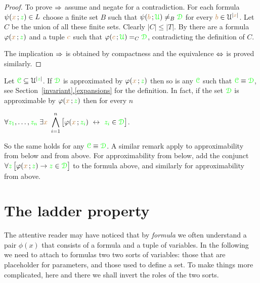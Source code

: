 \documentclass[creche.tex]{subfiles}
\begin{document}
\begin{proof}
To prove $\Rightarrow$ assume  and negate  for a contradiction. For each formula $\psi({\color{brown} x}\,;{\color{green} z})\in L$ choose a finite set $B$ such that $\psi({\color{brown} b}\,;{\color{green}\EuScript U})\neq_B{\color{green}\EuScript D}$ for every ${\color{brown} b}\in\EuScript U^{|{\color{brown} x}|}$. Let $C$ be the union of all these finite sets. Clearly $|C|\le|T|$. By  there are a formula $\varphi({\color{brown} x}\,;{\color{green} z})$ and a tuple ${\color{brown} c}$ such that $\varphi({\color{brown} c}\,;{\color{green}\EuScript U})=_C{\color{green}\EuScript D}$, contradicting the definition of $C$.

The implication $\Rightarrow$ is obtained by compactness and the equivalence $\Leftrightarrow$ is proved similarly. 
\end{proof}



\begin{remark}\label{prop_approx_el_eq}
Let ${\color{green}\EuScript C}\subseteq\EuScript U^{|{\color{green} z}|}$. If ${\color{green}\EuScript D}$ is approximated by $\varphi({\color{brown} x}\,;{\color{green} z})$ then so is any ${\color{green}\EuScript C}$ such that ${\color{green}\EuScript C}\equiv{\color{green}\EuScript D}$, see Section~\hyperref[expansions]{\ref*{invariant}.\ref*{expansions}} for the definition. In fact, if the set ${\color{green}\EuScript D}$ is approximable by $\varphi({\color{brown} x}\,;{\color{green} z})$ then for every $n$

\hfil$\displaystyle\A {\gr z_1},\dots,{\gr z_n}\;\E {\mr x}\ \bigwedge^n_{i=1}\big[\phi({\mr x}\,;{\gr z_i})\ \iff\ {\gr z_i}\in{\gr \D}\big]$. 

So the same holds for any ${\color{green}\EuScript C}\equiv{\color{green}\EuScript D}$. A similar remark apply to approximability from below and from above. For approximability from below, add the conjunct $\forall {\color{green}z}\,\big[\varphi({\color{brown} x}\,;{\color{green} z})\rightarrow {\color{green}z}\in{\color{green}\EuScript D}\big]$ to the formula above, and similarly for approximability from above.\QED
\end{remark}





\section{The ladder property}

The attentive reader may have noticed that by \textit{formula\/} we often understand a pair $\phi(x)$ that consists of a formula and a tuple of variables. In the following we need to attach to formulas two two sorts of variables: those that are placeholder for parameters, and those used to define a set. To make things more complicated, here and there we shall invert the roles of the two sorts.
\end{document}
